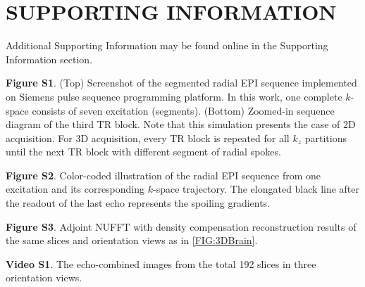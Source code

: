 \documentclass[a4paper,11pt]{article}
\begin{document}
\pagebreak

\section*{SUPPORTING INFORMATION}

Additional Supporting Information may be found online in 
the Supporting Information section.

\vspace{2em}

\noindent \textbf{Figure S1}. (Top) Screenshot of the segmented radial EPI sequence 
implemented on Siemens pulse sequence programming platform. In this work, one complete 
$k$-space consists of seven excitation (segments). 
(Bottom) Zoomed-in sequence diagram of the third TR block. 
Note that this simulation presents the case of 2D acquisition. 
For 3D acquisition, every TR block is repeated for all $k_z$ partitions 
until the next TR block with different segment of radial spokes.

\vspace{2em}

\noindent \textbf{Figure S2}. Color-coded illustration of the radial EPI sequence 
from one excitation and its corresponding $k$-space trajectory. 
The elongated black line after the readout of the last echo 
represents the spoiling gradients.

\vspace{2em}

\noindent \textbf{Figure S3}. Adjoint NUFFT with density compensation 
reconstruction results of the same slices and orientation views 
as in \cref{FIG:3DBrain}.

\vspace{2em}

\noindent \textbf{Video S1}. The echo-combined images from the total 192 slices in three orientation views.
\end{document}
